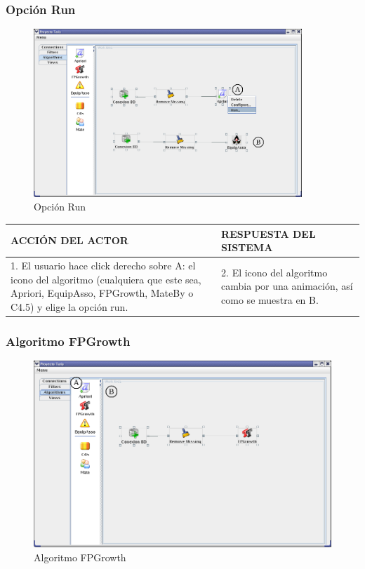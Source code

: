 \subsubsection{Opci\'on Run}
\begin{figure}[h]
 \centering
 \includegraphics[width=0.9\textwidth]{images/am3.png}
 \caption{Opci\'on Run}
\end{figure}

\begin{center}
\begin{tabular}{|p{60mm}|p{60mm}|}\hline
ACCI\'ON DEL ACTOR & RESPUESTA DEL SISTEMA \\ \hline
1. El usuario hace click derecho sobre A: el icono del algoritmo (cualquiera que este sea, Apriori, EquipAsso,
FPGrowth, MateBy o C4.5) y elige la opci\'on run.
& 2. El icono del algoritmo cambia por una animaci\'on, as\'i como se muestra en B. \\
\hline
\end{tabular}
\end{center}
\newpage

\subsubsection{Algoritmo FPGrowth}
\begin{figure}[h]
 \centering
 \includegraphics[width=1\textwidth]{images/a2.png}
 \caption{Algoritmo FPGrowth}
\end{figure}

